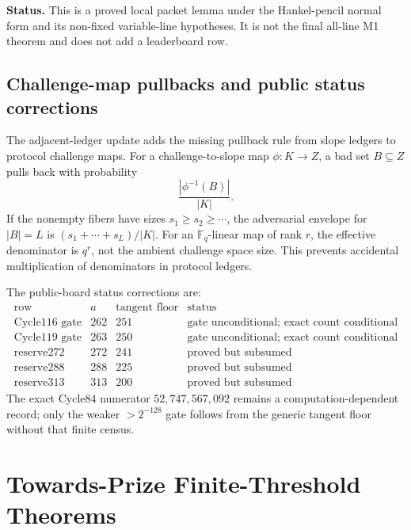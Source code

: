 \documentclass[11pt]{article}
\newcommand{\F}{\mathbb F}
\begin{document}
\textbf{Status.}  This is a proved local packet lemma under the Hankel-pencil
normal form and its non-fixed variable-line hypotheses.  It is not the final
all-line M1 theorem and does not add a leaderboard row.

\subsection{Challenge-map pullbacks and public status corrections}

The adjacent-ledger update adds the missing pullback rule from slope ledgers to
protocol challenge maps.  For a challenge-to-slope map \(\phi:K\to Z\), a bad
set \(B\subseteq Z\) pulls back with probability
\[
  \frac{|\phi^{-1}(B)|}{|K|}.
\]
If the nonempty fibers have sizes \(s_1\ge s_2\ge\cdots\), the adversarial
envelope for \(|B|=L\) is \((s_1+\cdots+s_L)/|K|\).  For an \(\F_q\)-linear map
of rank \(r\), the effective denominator is \(q^r\), not the ambient challenge
space size.  This prevents accidental multiplication of denominators in protocol
ledgers.

The public-board status corrections are:
\[
\begin{array}{c|c|c|c}
\text{row} & a & \text{tangent floor} & \text{status}\\
\hline
\text{Cycle116 gate} & 262 & 251 & \text{gate unconditional; exact count conditional}\\
\text{Cycle119 gate} & 263 & 250 & \text{gate unconditional; exact count conditional}\\
\text{reserve272} & 272 & 241 & \text{proved but subsumed}\\
\text{reserve288} & 288 & 225 & \text{proved but subsumed}\\
\text{reserve313} & 313 & 200 & \text{proved but subsumed}
\end{array}
\]
The exact Cycle84 numerator \(52{,}747{,}567{,}092\) remains a
computation-dependent record; only the weaker \(>2^{-128}\) gate follows from
the generic tangent floor without that finite census.







\section{Towards-Prize Finite-Threshold Theorems}
\label{sec:towards-prize-thresholds}
\end{document}
